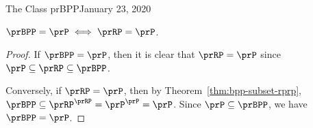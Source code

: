 \begin{lecture}{1}{The Class prBPP}{January 23, 2020}
\begin{proofsk}
\end{proofsk}

\begin{corollary}
    $\prBPP = \prP \iff \prRP = \prP$.
\end{corollary}

\begin{proof}
    If $\prBPP = \prP$, then it is clear that $\prRP = \prP$ since $\prP \subseteq
    \prRP \subseteq \prBPP$.

    Conversely, if $\prRP = \prP$, then by Theorem~\ref{thm:bpp-subset-rprp},
    $\prBPP \subseteq \prRP^\prRP = \prP^\prP = \prP$.
    Since $\prP \subseteq \prBPP$, we have $\prBPP = \prP$.
\end{proof}

\end{lecture}
